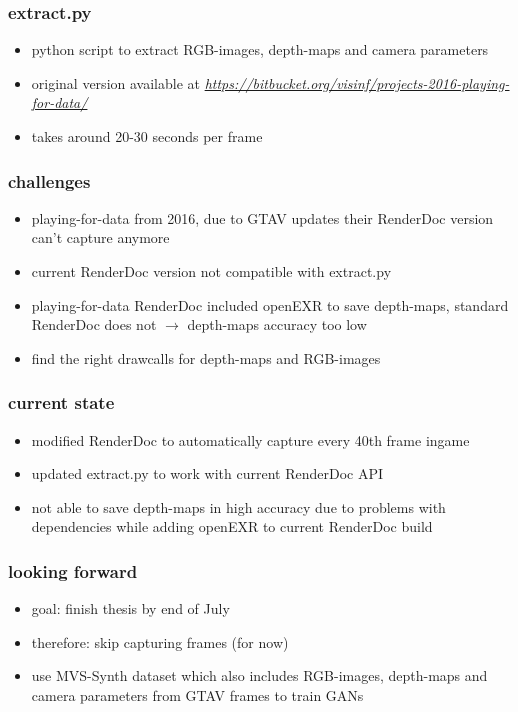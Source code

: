 \documentclass{beamer}
\begin{document}
\begin{frame}
	\frametitle{extract.py}
	\begin{itemize}
		\item python script to extract RGB-images, depth-maps and camera parameters
		\item original version available at \href{https://bitbucket.org/visinf/projects-2016-playing-for-data/}{\textit{https://bitbucket.org/visinf/projects-2016-playing-for-data/}}
		\item takes around 20-30 seconds per frame
	\end{itemize}
\end{frame}

\begin{frame}
	\frametitle{challenges}
	\begin{itemize}
		\item playing-for-data from 2016, due to GTAV updates their RenderDoc version can't capture anymore
		\item current RenderDoc version not compatible with extract.py
		\item playing-for-data RenderDoc included openEXR to save depth-maps, standard RenderDoc does not $\rightarrow$ depth-maps accuracy too low
		\item find the right drawcalls for depth-maps and RGB-images
	\end{itemize}
\end{frame}

\begin{frame}
	\frametitle{current state}
	\begin{itemize}
		\item modified RenderDoc to automatically capture every 40th frame ingame
		\item updated extract.py to work with current RenderDoc API
		\item not able to save depth-maps in high accuracy due to problems with dependencies while adding openEXR to current RenderDoc build
	\end{itemize}
\end{frame}

\begin{frame}
	\frametitle{looking forward}
	\begin{itemize}
		\item goal: finish thesis by end of July
		\item therefore: skip capturing frames (for now)
		\item use MVS-Synth dataset which also includes RGB-images, depth-maps and camera parameters from GTAV frames to train GANs
	\end{itemize}
\end{frame}
\end{document}
